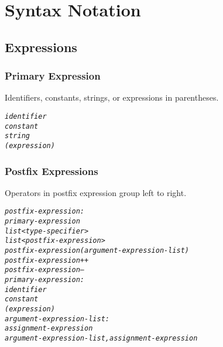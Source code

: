 \documentclass[12pt]{report}
\begin{document}
\section{Syntax Notation}

\subsection{Expressions}

\subsubsection{Primary Expression}

Identifiers, constants, strings, or expressions in parentheses.
\begin{alltt}
            \textit{identifier}
            \textit{constant}
            \textit{string}
            \textit{( expression )}
\end{alltt}

\subsubsection{Postfix Expressions}

Operators in postfix expression group left to right.
\begin{alltt}
         \textit{postfix-expression:}
              \textit{primary-expression}
              \textit{list<type-specifier>}
              \textit{list<postfix-expression>}
              \textit{postfix-expression ( argument-expression-list )}
              \textit{postfix-expression ++}
              \textit{postfix-expression --}
         \textit{primary-expression:}
              \textit{identifier}
              \textit{constant}
              \textit{( expression )}
         \textit{argument-expression-list:}
              \textit{assignment-expression}
              \textit{argument-expression-list , assignment-expression}
\end{alltt}
\end{document}
